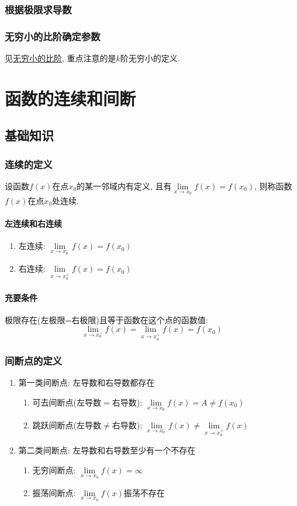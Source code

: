 \subsection{根据极限求导数}
\subsection{无穷小的比阶确定参数}
见\hyperref[无穷小的比阶]{无穷小的比阶}, 重点注意的是$ k $阶无穷小的定义.
\chapter{函数的连续和间断}
\section{基础知识}
\subsection{连续的定义}
设函数$ f(x) $在点$ x_{0} $的某一邻域内有定义, 且有$ \lim\limits_{x\rightarrow x_{0}}f(x)=f(x_{0}) $, 则称函数$ f(x) $在点$ x_{0} $处连续.
\subsubsection{左连续和右连续}
\begin{enumerate}
\item 左连续: $ \lim\limits_{x \rightarrow x_{0}^{-}}f(x)=f(x_{0}) $
\item 右连续: $ \lim\limits_{x \rightarrow x_{0}^{+}}f(x)=f(x_{0}) $
\end{enumerate}
\subsubsection{充要条件}
极限存在(左极限=右极限)且等于函数在这个点的函数值:
\begin{equation*}
\lim\limits_{x \rightarrow x_{0}^{-}}f(x)=\lim\limits_{x \rightarrow x_{0}^{+}}f(x)=f(x_{0})
\end{equation*}
\subsection{间断点的定义}
\begin{enumerate}
\item 第一类间断点: 左导数和右导数都存在
\begin{enumerate}
\item 可去间断点(左导数$ = $右导数): $ \lim\limits_{x\rightarrow x_{0}}f(x)=A\neq f(x_{0}) $
\item 跳跃间断点(左导数$ \neq $右导数): $ \lim\limits_{x\rightarrow x_{0}^{-}}f(x) \neq \lim\limits_{x\rightarrow x_{0}^{+}}f(x) $
\end{enumerate}
\item 第二类间断点: 左导数和右导数至少有一个不存在
\begin{enumerate}
\item 无穷间断点: $ \lim\limits_{x\rightarrow x_{0}}f(x)=\infty $
\item 振荡间断点: $ \lim\limits_{x\rightarrow x_{0}}f(x) $振荡不存在
\end{enumerate}
\end{enumerate}
